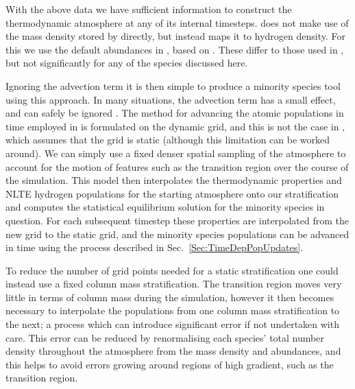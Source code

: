 With the above data we have sufficient information to construct the \Radyn{} thermodynamic atmosphere at any of its internal timesteps.
\Lw{} does not make use of the mass density stored by \Radyn{} directly, but instead maps it to hydrogen density.
For this we use the default abundances in \Lw{}, based on \citet{Asplund2009}.
These differ to those used in \Radyn{}, but not significantly for any of the species discussed here.

Ignoring the advection term it is then simple to produce a minority species tool using this approach.
In many situations, the advection term has a small effect, and can safely be ignored \citep{Kasparova2003,Nejezchleba1998}.
The method for advancing the atomic populations in time employed in \Radyn{} is formulated on the dynamic grid, and this is not the case in \Lw{}, which assumes that the grid is static (although this limitation can be worked around).
We can simply use a fixed denser spatial sampling of the atmosphere to account for the motion of features such as the transition region over the course of the simulation.
This model then interpolates the thermodynamic properties and NLTE hydrogen populations for the starting atmosphere onto our stratification and computes the statistical equilibrium solution for the minority species in question.
For each subsequent timestep these properties are interpolated from the new \Radyn{} grid to the static grid, and the minority species populations can be advanced in time using the process described in Sec.~\ref{Sec:TimeDepPopUpdates}.

To reduce the number of grid points needed for a static stratification one could instead use a fixed column mass stratification.
The transition region moves very little in terms of column mass during the simulation, however it then becomes necessary to interpolate the populations from one column mass stratification to the next; a process which can introduce significant error if not undertaken with care.
This error can be reduced by renormalising each species' total number density throughout the atmosphere from the mass density and abundances, and this helps to avoid errors growing around regions of high gradient, such as the transition region.

